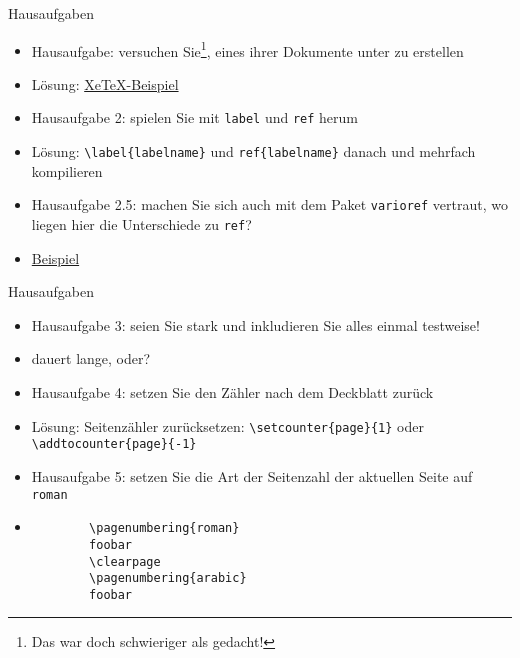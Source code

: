 \begin{frame}[fragile]{Hausaufgaben}

\begin{itemize}[<+->]
    \item Hausaufgabe: versuchen Sie\footnote{Das war doch schwieriger als gedacht!}, eines ihrer Dokumente unter \XeTeX zu erstellen
    \item Lösung: \href{https://github.com/inktrap/LaTeXKurs/tree/master/4/tex/}{XeTeX-Beispiel}
    \item Hausaufgabe 2: spielen Sie mit \lstinline|label| und \lstinline|ref| herum
    \item Lösung: \lstinline|\label{labelname}| und \lstinline|ref{labelname}| danach und mehrfach kompilieren
    \item Hausaufgabe 2.5: machen Sie sich auch mit dem Paket \lstinline|varioref| vertraut, wo liegen hier die Unterschiede zu \lstinline|ref|?
    \item \href{https://github.com/inktrap/LaTeXKurs/tree/master/4/tex/}{Beispiel}
\end{itemize}
    
\end{frame}

\begin{frame}[fragile]{Hausaufgaben}
    
    \begin{itemize}[<+->]
        \item Hausaufgabe 3: seien Sie stark und inkludieren Sie alles einmal testweise!
        \item dauert lange, oder?
        \item Hausaufgabe 4: setzen Sie den Zähler nach dem Deckblatt zurück
        \item Lösung: Seitenzähler zurücksetzen: \lstinline|\setcounter{page}{1}| oder \lstinline|\addtocounter{page}{-1}|
        \item Hausaufgabe 5: setzen Sie die Art der Seitenzahl der aktuellen Seite auf \texttt{roman}
        \item \begin{lstlisting}
        \pagenumbering{roman}
        foobar
        \clearpage
        \pagenumbering{arabic}
        foobar
        \end{lstlisting}
    \end{itemize}

\end{frame}

